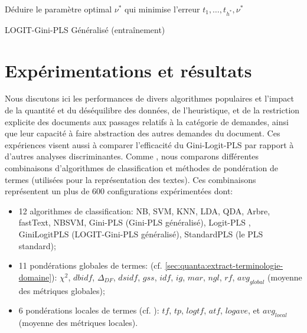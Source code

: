 \begin{algorithm}[h]
	\small{}
	Déduire le paramètre optimal $\nu^*$ qui minimise l'erreur \;
	\Return $t_1,\ldots,t_{h^*}, \nu^*$\; 
	\caption{LOGIT-Gini-PLS Généralisé (entraînement)}\label{LG-GPLS}
\end{algorithm}

\section{Expérimentations et résultats}
\label{sec:sensresultat:experimentations}



Nous discutons ici les performances de divers algorithmes populaires et l'impact de la quantité et du déséquilibre des données, de l'heuristique, et de la restriction explicite des documents aux passages relatifs à la catégorie de demandes, ainsi que leur capacité à faire abstraction des autres demandes du document. {Ces expériences visent aussi à comparer l'efficacité du Gini-Logit-PLS par rapport à d'autres analyses discriminantes}. Comme \citet{im2017textclasstermweighting}, nous comparons différentes combinaisons d'algorithmes de classification et méthodes de pondération de termes (utilisées pour la représentation des textes).  Ces combinaisons représentent un plus de 600 configurations expérimentées dont:
\begin{itemize}
	\item 12 algorithmes de classification: NB, SVM, KNN, LDA, QDA, Arbre, fastText, NBSVM, Gini-PLS (Gini-PLS généralisé), Logit-PLS \citep{tenenhaus2005logitpls}, GiniLogitPLS (LOGIT-Gini-PLS généralisé), StandardPLS (le PLS standard);
	\item 11 pondérations globales de termes: (cf. \ref{sec:quanta:extract-terminologie-domaine}): $\chi^2$, $dbidf$, $\Delta_{DF}$, $dsidf$, $gss$, $idf$, $ig$, $mar$, $ngl$, $rf$, $avg_{global}$ (moyenne des métriques globales);
	\item 6 pondérations locales de termes (cf. ): $tf$, $tp$, $logtf$, $atf$, $logave$, et $avg_{local}$ (moyenne des métriques locales).
\end{itemize}
 
